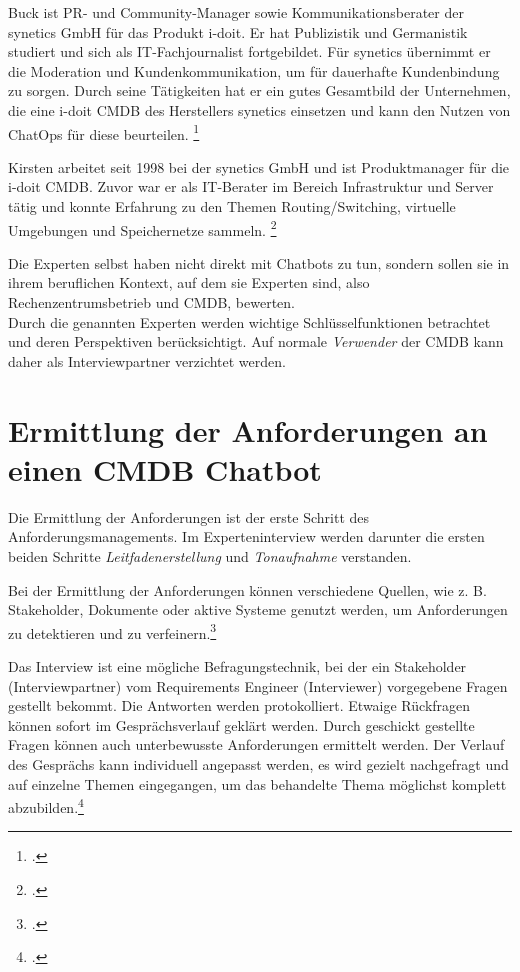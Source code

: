 Buck ist PR- und Community-Manager sowie Kommunikationsberater der synetics GmbH für das Produkt i-doit. Er hat  Publizistik und Germanistik studiert und sich als IT-Fachjournalist fortgebildet. Für synetics übernimmt er die Moderation und Kundenkommunikation, um für dauerhafte Kundenbindung zu sorgen. Durch seine Tätigkeiten hat er ein gutes Gesamtbild der Unternehmen, die eine i-doit \acs{CMDB} des Herstellers synetics einsetzen und kann den Nutzen von ChatOps für diese beurteilen. 
\footcites[Vgl.][o. \pno]{Buck_2018_Allgemein}[Vgl.][o. \pno]{Buck_2018_Referenzen}

Kirsten arbeitet seit 1998 bei der synetics GmbH und ist Produktmanager für die i-doit \acs{CMDB}. Zuvor war er als IT-Berater im Bereich Infrastruktur und Server tätig und konnte Erfahrung zu den Themen Routing/Switching, virtuelle Umgebungen und Speichernetze sammeln.
\footcite[Vgl.][o. \pno]{Kirsten_2017}

Die Experten selbst haben nicht direkt mit Chatbots zu tun, sondern sollen sie in ihrem beruflichen Kontext, auf dem sie Experten sind, also Rechenzentrumsbetrieb und \acs{CMDB}, bewerten.\\
Durch die genannten Experten werden wichtige Schlüsselfunktionen betrachtet und deren Perspektiven berücksichtigt. Auf normale \textit{Verwender} der \acs{CMDB} kann daher als Interviewpartner verzichtet werden.


\section{Ermittlung der Anforderungen an einen CMDB Chatbot}
Die Ermittlung der Anforderungen ist der erste Schritt des Anforderungsmanagements. Im Experteninterview werden darunter die ersten beiden Schritte \textit{Leitfadenerstellung} und \textit{Tonaufnahme} verstanden.

Bei der Ermittlung der Anforderungen können verschiedene Quellen, wie z. B. Stakeholder, Dokumente oder aktive Systeme genutzt werden, um Anforderungen zu detektieren und zu verfeinern.\footcite[Vgl.][21]{Pohl_2015_Requirements}

Das Interview ist eine mögliche Befragungstechnik, bei der ein Stakeholder (Interviewpartner) vom Requirements Engineer (Interviewer) vorgegebene Fragen gestellt bekommt. Die Antworten werden protokolliert. Etwaige Rückfragen können sofort im Gesprächsverlauf geklärt werden. Durch geschickt gestellte Fragen können auch unterbewusste Anforderungen ermittelt werden. Der Verlauf des Gesprächs kann individuell angepasst werden, es wird gezielt nachgefragt und auf einzelne Themen eingegangen, um das behandelte Thema möglichst komplett abzubilden.\footcite[Vgl.][28]{Pohl_2015_Requirements}

